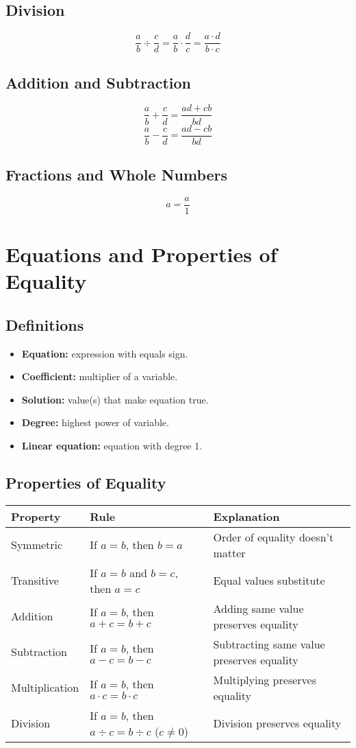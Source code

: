 \documentclass[12pt]{article}
\begin{document}
\subsection*{Division}
\[
\frac{a}{b} \div \frac{c}{d} = \frac{a}{b} \cdot \frac{d}{c} = \frac{a \cdot d}{b \cdot c}
\]

\subsection*{Addition and Subtraction}
\[
\frac{a}{b} + \frac{c}{d} = \frac{ad + cb}{bd}
\]
\[
\frac{a}{b} - \frac{c}{d} = \frac{ad - cb}{bd}
\]

\subsection*{Fractions and Whole Numbers}
\[
a = \frac{a}{1}
\]

\section*{Equations and Properties of Equality}

\subsection*{Definitions}

\begin{itemize}
    \item \textbf{Equation:} expression with equals sign.
    \item \textbf{Coefficient:} multiplier of a variable.
    \item \textbf{Solution:} value(s) that make equation true.
    \item \textbf{Degree:} highest power of variable.
    \item \textbf{Linear equation:} equation with degree 1.
\end{itemize}

\subsection*{Properties of Equality}

\begin{tabular}{|l|l|p{8cm}|}
\hline
\textbf{Property} & \textbf{Rule} & \textbf{Explanation} \\
\hline
Symmetric & If $a = b$, then $b = a$ & Order of equality doesn't matter \\
Transitive & If $a = b$ and $b = c$, then $a = c$ & Equal values substitute \\
Addition & If $a = b$, then $a + c = b + c$ & Adding same value preserves equality \\
Subtraction & If $a = b$, then $a - c = b - c$ & Subtracting same value preserves equality \\
Multiplication & If $a = b$, then $a \cdot c = b \cdot c$ & Multiplying preserves equality \\
Division & If $a = b$, then $a \div c = b \div c$ ($c \neq 0$) & Division preserves equality \\
\hline
\end{tabular}
\end{document}
